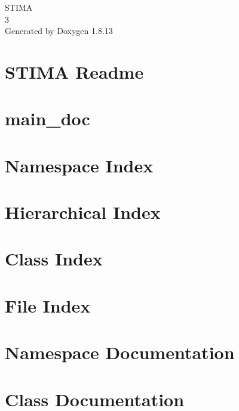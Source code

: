 \documentclass[twoside]{book}
\newcommand{\+}{\discretionary{\mbox{\scriptsize$\hookleftarrow$}}{}{}}
\newcommand{\clearemptydoublepage}{%
  \newpage{\pagestyle{empty}\cleardoublepage}%
}
\begin{document}
\hypersetup{pageanchor=false,
             bookmarksnumbered=true,
             pdfencoding=unicode
            }
\begin{titlepage}
\vspace*{7cm}
\begin{center}%
{\Large S\+T\+I\+MA \\[1ex]\large 3 }\\
\vspace*{1cm}
{\large Generated by Doxygen 1.8.13}\\
\end{center}
\end{titlepage}
\clearemptydoublepage
{}
\tableofcontents
\clearemptydoublepage
{}
\hypersetup{pageanchor=true}

\chapter{S\+T\+I\+MA Readme}
\label{index}\hypertarget{index}{}
\chapter{main\+\_\+doc}
\label{md_main_doc}

\chapter{Namespace Index}

\chapter{Hierarchical Index}

\chapter{Class Index}

\chapter{File Index}

\chapter{Namespace Documentation}



\chapter{Class Documentation}












\end{document}

